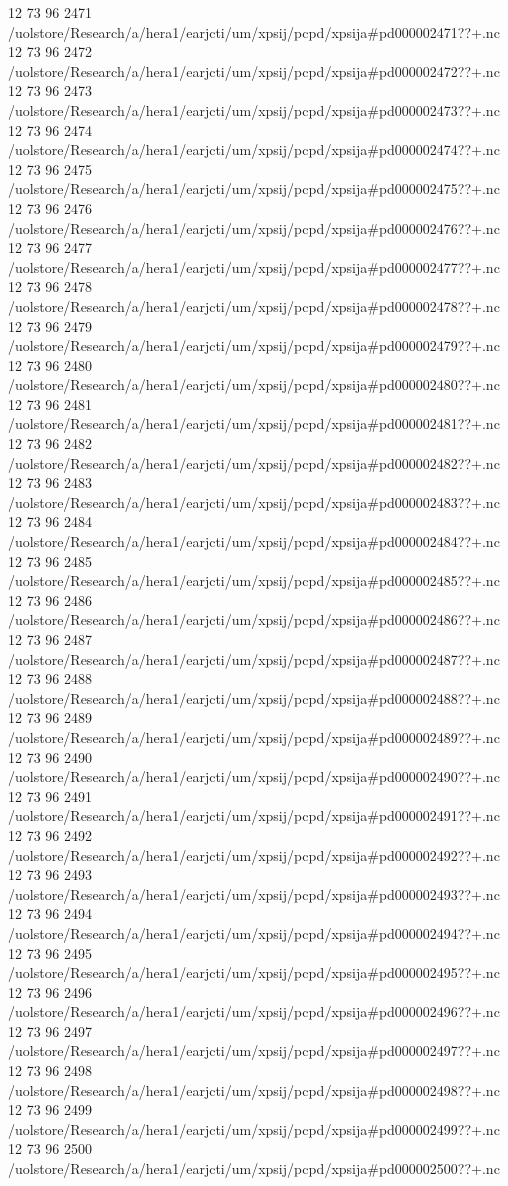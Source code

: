 12 73 96
2471
/uolstore/Research/a/hera1/earjcti/um/xpsij/pcpd/xpsija#pd000002471??+.nc
12 73 96
2472
/uolstore/Research/a/hera1/earjcti/um/xpsij/pcpd/xpsija#pd000002472??+.nc
12 73 96
2473
/uolstore/Research/a/hera1/earjcti/um/xpsij/pcpd/xpsija#pd000002473??+.nc
12 73 96
2474
/uolstore/Research/a/hera1/earjcti/um/xpsij/pcpd/xpsija#pd000002474??+.nc
12 73 96
2475
/uolstore/Research/a/hera1/earjcti/um/xpsij/pcpd/xpsija#pd000002475??+.nc
12 73 96
2476
/uolstore/Research/a/hera1/earjcti/um/xpsij/pcpd/xpsija#pd000002476??+.nc
12 73 96
2477
/uolstore/Research/a/hera1/earjcti/um/xpsij/pcpd/xpsija#pd000002477??+.nc
12 73 96
2478
/uolstore/Research/a/hera1/earjcti/um/xpsij/pcpd/xpsija#pd000002478??+.nc
12 73 96
2479
/uolstore/Research/a/hera1/earjcti/um/xpsij/pcpd/xpsija#pd000002479??+.nc
12 73 96
2480
/uolstore/Research/a/hera1/earjcti/um/xpsij/pcpd/xpsija#pd000002480??+.nc
12 73 96
2481
/uolstore/Research/a/hera1/earjcti/um/xpsij/pcpd/xpsija#pd000002481??+.nc
12 73 96
2482
/uolstore/Research/a/hera1/earjcti/um/xpsij/pcpd/xpsija#pd000002482??+.nc
12 73 96
2483
/uolstore/Research/a/hera1/earjcti/um/xpsij/pcpd/xpsija#pd000002483??+.nc
12 73 96
2484
/uolstore/Research/a/hera1/earjcti/um/xpsij/pcpd/xpsija#pd000002484??+.nc
12 73 96
2485
/uolstore/Research/a/hera1/earjcti/um/xpsij/pcpd/xpsija#pd000002485??+.nc
12 73 96
2486
/uolstore/Research/a/hera1/earjcti/um/xpsij/pcpd/xpsija#pd000002486??+.nc
12 73 96
2487
/uolstore/Research/a/hera1/earjcti/um/xpsij/pcpd/xpsija#pd000002487??+.nc
12 73 96
2488
/uolstore/Research/a/hera1/earjcti/um/xpsij/pcpd/xpsija#pd000002488??+.nc
12 73 96
2489
/uolstore/Research/a/hera1/earjcti/um/xpsij/pcpd/xpsija#pd000002489??+.nc
12 73 96
2490
/uolstore/Research/a/hera1/earjcti/um/xpsij/pcpd/xpsija#pd000002490??+.nc
12 73 96
2491
/uolstore/Research/a/hera1/earjcti/um/xpsij/pcpd/xpsija#pd000002491??+.nc
12 73 96
2492
/uolstore/Research/a/hera1/earjcti/um/xpsij/pcpd/xpsija#pd000002492??+.nc
12 73 96
2493
/uolstore/Research/a/hera1/earjcti/um/xpsij/pcpd/xpsija#pd000002493??+.nc
12 73 96
2494
/uolstore/Research/a/hera1/earjcti/um/xpsij/pcpd/xpsija#pd000002494??+.nc
12 73 96
2495
/uolstore/Research/a/hera1/earjcti/um/xpsij/pcpd/xpsija#pd000002495??+.nc
12 73 96
2496
/uolstore/Research/a/hera1/earjcti/um/xpsij/pcpd/xpsija#pd000002496??+.nc
12 73 96
2497
/uolstore/Research/a/hera1/earjcti/um/xpsij/pcpd/xpsija#pd000002497??+.nc
12 73 96
2498
/uolstore/Research/a/hera1/earjcti/um/xpsij/pcpd/xpsija#pd000002498??+.nc
12 73 96
2499
/uolstore/Research/a/hera1/earjcti/um/xpsij/pcpd/xpsija#pd000002499??+.nc
12 73 96
2500
/uolstore/Research/a/hera1/earjcti/um/xpsij/pcpd/xpsija#pd000002500??+.nc
